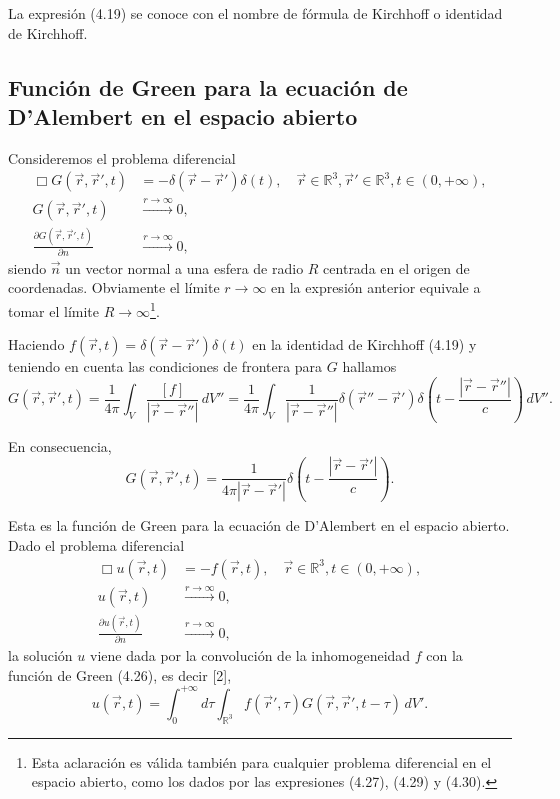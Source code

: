 \documentclass[12pt,a4paper]{book}
\begin{document}
La expresión (4.19) se conoce con el nombre de fórmula de Kirchhoff o identidad de Kirchhoff.

\subsection{Función de Green para la ecuación de D'Alembert en el espacio abierto}

Consideremos el problema diferencial
\begin{align}
\Box G(\vec{r},\vec{r}', t) &= -\delta(\vec{r} - \vec{r}')\delta(t), \quad \vec{r} \in \mathbb{R}^3, \vec{r}' \in \mathbb{R}^3, t \in (0, +\infty), \\
G(\vec{r},\vec{r}', t) &\xrightarrow{r\to\infty} 0, \\
\frac{\partial G(\vec{r},\vec{r}', t)}{\partial n} &\xrightarrow{r\to\infty} 0,
\end{align}
siendo $\vec{n}$ un vector normal a una esfera de radio $R$ centrada en el origen de coordenadas. Obviamente el límite $r \to \infty$ en la expresión anterior equivale a tomar el límite $R \to \infty$\footnote{Esta aclaración es válida también para cualquier problema diferencial en el espacio abierto, como los dados por las expresiones (4.27), (4.29) y (4.30).}.

Haciendo $f(\vec{r}, t) = \delta(\vec{r} - \vec{r}')\delta(t)$ en la identidad de Kirchhoff (4.19) y teniendo en cuenta las condiciones de frontera para $G$ hallamos
\begin{equation}
G(\vec{r},\vec{r}', t) = \frac{1}{4\pi}\int_V \frac{[f]}{|\vec{r} - \vec{r}''|}\,dV'' = \frac{1}{4\pi}\int_V \frac{1}{|\vec{r} - \vec{r}''|}\delta(\vec{r}'' - \vec{r}')\delta\left(t - \frac{|\vec{r} - \vec{r}''|}{c}\right)\,dV''.
\end{equation}

En consecuencia,
\begin{equation}
G(\vec{r},\vec{r}', t) = \frac{1}{4\pi|\vec{r} - \vec{r}'|}\delta\left(t - \frac{|\vec{r} - \vec{r}'|}{c}\right).
\end{equation}

Esta es la función de Green para la ecuación de D'Alembert en el espacio abierto. Dado el problema diferencial
\begin{align}
\Box u(\vec{r}, t) &= -f(\vec{r}, t), \quad \vec{r} \in \mathbb{R}^3, t \in (0, +\infty), \\
u(\vec{r}, t) &\xrightarrow{r\to\infty} 0, \\
\frac{\partial u(\vec{r}, t)}{\partial n} &\xrightarrow{r\to\infty} 0,
\end{align}
la solución $u$ viene dada por la convolución de la inhomogeneidad $f$ con la función de Green (4.26), es decir [2],
\begin{equation}
u(\vec{r}, t) = \int_0^{+\infty} d\tau \int_{\mathbb{R}^3} f(\vec{r}', \tau)G(\vec{r},\vec{r}', t - \tau)\,dV'.
\end{equation}
\end{document}

